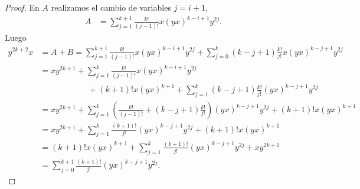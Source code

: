 \documentclass[a4paper,oneside,fleqn,11pt]{article}
\numberwithin{prop}{subsection}
\begin{document}
\begin{proof}
En $A$ realizamos el cambio de variables $j = i + 1$,
\begin{align*}
	A &= \sum_{j = 1}^{k + 1} \frac{k!}{(j-1)!} x(yx)^{k - i + 1}y^{2j}.
\end{align*}
Luego
\begin{align*}
	y^{2k + 2}x &= A + B = \sum_{j = 1}^{k + 1} \frac{k!}{(j-1)!} x(yx)^{k - i + 1}y^{2j}
		+ \sum_{j = 0}^k (k - j + 1)\frac{k!}{j!} x(yx)^{k - j + 1}y^{2j} \\
	&= xy^{2k + 1} + \sum_{j = 1}^{k} \frac{k!}{(j-1)!} x(yx)^{k - i + 1}y^{2j} \\
		&\hspace{70pt}+ (k+1)!x(yx)^{k + 1} + \sum_{j = 1}^k (k - j + 1)\frac{k!}{j!} (yx)^{k - j + 1}y^{2j} \\
	&= xy^{2k + 1} + \sum_{j = 1}^k \left( \frac{k!}{(j-1)!} + (k - j + 1)\frac{k!}{j!} \right) (yx)^{k - j + 1}y^{2j} 
		+ (k+1)!x(yx)^{k + 1} \\
	&= xy^{2k + 1} +\sum_{j = 1}^k \frac{(k + 1)!}{j!} (yx)^{k - j + 1}y^{2j} + (k+1)!x(yx)^{k + 1} \\
	&= (k+1)!x(yx)^{k + 1} + \sum_{j = 1}^k \frac{(k + 1)!}{j!} (yx)^{k - j + 1}y^{2j} + xy^{2k + 1} \\
	&= \sum_{j = 0}^{k + 1} \frac{(k + 1)!}{j!} (yx)^{k - j + 1}y^{2j}.
\end{align*}
\end{proof}
\end{document}
